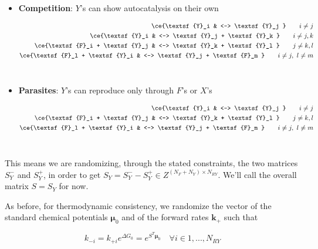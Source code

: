 \documentclass{article}
\begin{document}
\begin{itemize}
    \item \textbf{Competition}: $Y$'s can show autocatalysis on their own

\begin{equation}
		\begin{split}
\ce{\textsf{Y}_i & <--> \textsf{Y}_j } \quad \quad i \neq j \\ 
\ce{\textsf{Y}_i & <--> \textsf{Y}_j + \textsf{Y}_k } \quad \quad i \neq j,k \\ 
\ce{\textsf{F}_i + \textsf{Y}_j & <--> \textsf{Y}_k + \textsf{Y}_l } \quad \quad j \neq k,l \\ 
\ce{\textsf{F}_l + \textsf{Y}_i & <--> \textsf{Y}_j + \textsf{F}_m } \quad \quad i \neq j , \ l \neq m\\ 
\end{split} 
\end{equation}
\\

\item \textbf{Parasites}: $Y$'s can reproduce only through $F$'s or $X$'s

\begin{equation}
		\begin{split}
\ce{\textsf{Y}_i & <--> \textsf{Y}_j } \quad \quad i \neq j \\ 
\ce{\textsf{F}_i + \textsf{Y}_j & <--> \textsf{Y}_k + \textsf{Y}_l } \quad \quad j \neq k,l \\ 
\ce{\textsf{F}_l + \textsf{Y}_i & <--> \textsf{Y}_j + \textsf{F}_m } \quad \quad i \neq j , \ l \neq m\\ 
\end{split} 
\end{equation}
\\

\end{itemize}

This means we are randomizing, through the stated constraints, the two matrices $S^-_Y$ and $S^+_Y$, in order to get $S_Y =S^-_Y-S^+_Y  \in Z^{{(N_F+N_Y)} \times N_{RY}}$. We'll call the overall matrix $S=S_Y$ for now.

As before, for thermodynamic consistency, we randomize the vector of the standard chemical potentials $\pmb{\mu}_0$ and of the forward rates $\pmb{k}_+$ such that

\begin{center}
    \begin{equation}
       k_{-i} = k_{+i} e^{\Delta G_0} = e^{S^T\pmb{\mu}_0} \quad \forall i \in 1, . . ., N_{RY}
    \end{equation}
\end{center}
\end{document}

